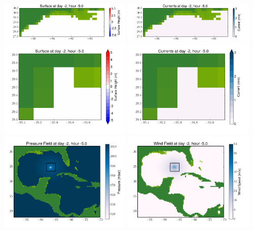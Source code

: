 \documentclass[11pt]{article}
\begin{document}
\includegraphics[width=0.475\textwidth]{frame0019fig4.png}
\vskip 10pt 
\includegraphics[width=0.475\textwidth]{frame0019fig5.png}
\includegraphics[width=0.475\textwidth]{frame0019fig6.png}
\vskip 10pt 
\includegraphics[width=0.475\textwidth]{frame0019fig7.png}
\includegraphics[width=0.475\textwidth]{frame0019fig8.png}
\vskip 10pt 
\includegraphics[width=0.475\textwidth]{frame0019fig9.png}
\end{document}
